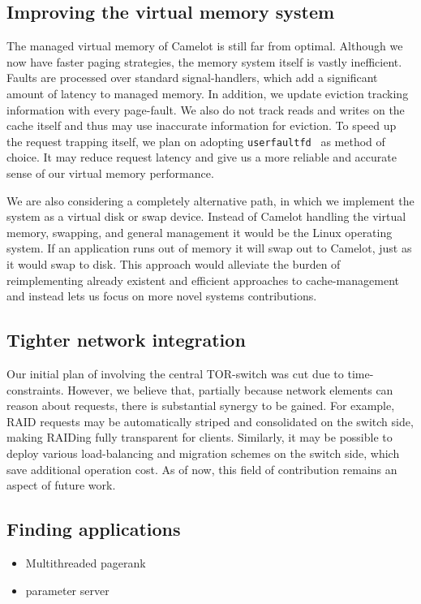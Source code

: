 \subsection{Improving the virtual memory system}
The managed virtual memory of Camelot is still far from optimal. Although we now have faster paging strategies, the memory system itself is vastly inefficient. Faults are processed over standard signal-handlers, which add a significant amount of latency to managed memory. In addition, we update eviction tracking information with every page-fault. We also do not track reads and writes on the cache itself and thus may use inaccurate information for eviction.
To speed up the request trapping itself, we plan on adopting \texttt{userfaultfd}~\cite{userfaultfd} as method of choice. It may reduce request latency and give us a more reliable and accurate sense of our virtual memory performance.

We are also considering a completely alternative path, in which we implement the system as a virtual disk or swap device. Instead of Camelot handling the virtual memory, swapping, and general management it would be the Linux operating system. If an application runs out of memory it will swap out to Camelot, just as it would swap to disk. This approach would alleviate the burden of reimplementing already existent and efficient approaches to cache-management and instead lets us focus on more novel systems contributions.

\subsection{Tighter network integration}
Our initial plan of involving the central TOR-switch was cut due to time-constraints. However, we believe that, partially because network elements can reason about requests, there is substantial synergy to be gained. For example, RAID requests may be automatically striped and consolidated on the switch side, making RAIDing fully transparent for clients. Similarly, it may be possible to deploy various load-balancing and migration schemes on the switch side, which save additional operation cost. 
As of now, this field of contribution remains an aspect of future work.
\subsection{Finding applications}
\begin{itemize}
\item Multithreaded pagerank
\item parameter server
\end{itemize}


\label{sec:future}
